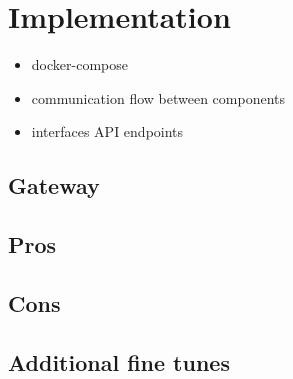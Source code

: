 \chapter{Implementation}

\begin{itemize}
	\item docker-compose
	\item communication flow between components
	\item interfaces API endpoints
\end{itemize}

\section{Gateway}

\section{Pros}

\section{Cons}

\section{Additional fine tunes}
